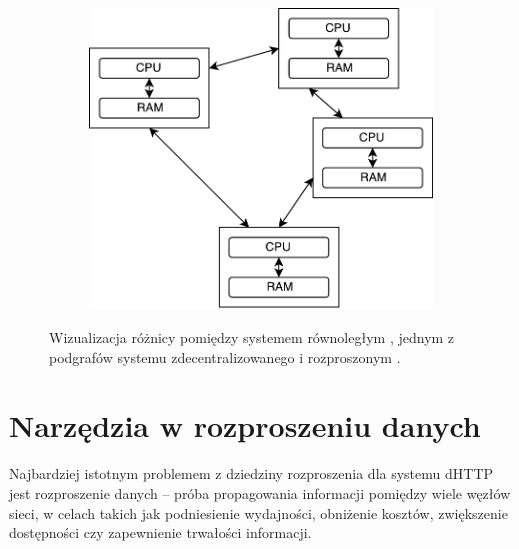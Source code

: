 \begin{figure}[h]
\begin{subfigure}{0.6\textwidth}
		\centering
		\includegraphics[scale=0.5]{distributed.pdf}
		\subcaption{\label{subfigure_c}}
	\end{subfigure}
	
	\caption{\label{fig:concurrentVsParalell}Wizualizacja różnicy pomiędzy systemem równoległym \protect{}, jednym z podgrafów systemu zdecentralizowanego \protect{} i rozproszonym \protect{}.}

\end{figure}


\section{Narzędzia w rozproszeniu danych}
\label{sec:narzedzia}
Najbardziej istotnym problemem z dziedziny rozproszenia dla systemu dHTTP jest rozproszenie danych -- próba propagowania informacji pomiędzy wiele węzłów sieci, w celach takich jak podniesienie wydajności, obniżenie kosztów, zwiększenie dostępności czy zapewnienie trwałości informacji.

